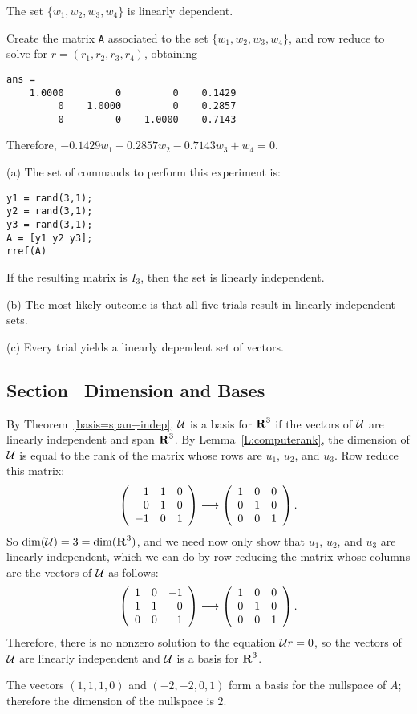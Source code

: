 \documentclass{ximera}
\begin{document}
 \ans The set $\{w_1,w_2,w_3,w_4\}$ is linearly dependent.

\soln Create the matrix {\tt A} associated to the set
$\{w_1,w_2,w_3,w_4\}$, and row reduce to solve for
$r = (r_1,r_2,r_3,r_4)$, obtaining
\begin{verbatim}
ans =
    1.0000         0         0    0.1429
         0    1.0000         0    0.2857
         0         0    1.0000    0.7143
\end{verbatim}
Therefore, $-0.1429w_1 - 0.2857w_2 - 0.7143w_3 + w_4 = 0$.

(a) The set of commands to perform this experiment is:
\begin{verbatim}
y1 = rand(3,1);
y2 = rand(3,1);
y3 = rand(3,1);
A = [y1 y2 y3];
rref(A)
\end{verbatim}
If the resulting matrix is $I_3$, then the set is linearly
independent.

(b) The most likely outcome is that all five trials result in
linearly independent sets.

(c) Every trial yields a linearly dependent set of vectors.



\subsection*{Section~\protect{\ref{S:5.5}} Dimension and Bases}

By Theorem~\ref{basis=span+indep},
${\cal U}$ is a basis for $\mbox{$\bf{R}$}^3$ if the vectors of ${\cal U}$ are
linearly independent and span $\mbox{$\bf{R}$}^3$.  By Lemma~\ref{L:computerank},
the dimension of ${\cal U}$ is equal to the rank of the matrix whose
rows are $u_1$, $u_2$, and $u_3$.  Row reduce this matrix:
\[
\left(\begin{array}{rrr} 1 & 1 & 0 \\ 0 & 1 & 0 \\ -1 & 0 & 1\end{array}\right) \longrightarrow
\left(\begin{array}{rrr} 1 & 0 & 0 \\ 0 & 1 & 0 \\ 0 & 0 & 1\end{array}\right).
\]
So $\dim({\cal U}) = 3 = \dim(\mbox{$\bf{R}$}^3)$, and we need now only show that
$u_1$, $u_2$, and $u_3$ are linearly independent, which we can do by
row reducing the matrix whose columns are the vectors of ${\cal U}$ as
follows:
\[
\left(\begin{array}{rrr} 1 & 0 & -1 \\ 1 & 1 & 0 \\ 0 & 0 & 1\end{array}\right) \longrightarrow
\left(\begin{array}{rrr} 1 & 0 & 0 \\ 0 & 1 & 0 \\ 0 & 0 & 1\end{array}\right).
\]
Therefore, there is no nonzero solution to the equation
${\cal U}r = 0$, so the vectors of ${\cal U}$ are linearly independent
and ${\cal U}$ is a basis for $\mbox{$\bf{R}$}^3$.

\ans The vectors $(1,1,1,0)$ and $(-2,-2,0,1)$ form a basis for the
nullspace of $A$; therefore the dimension of the nullspace is $2$.
\end{document}
